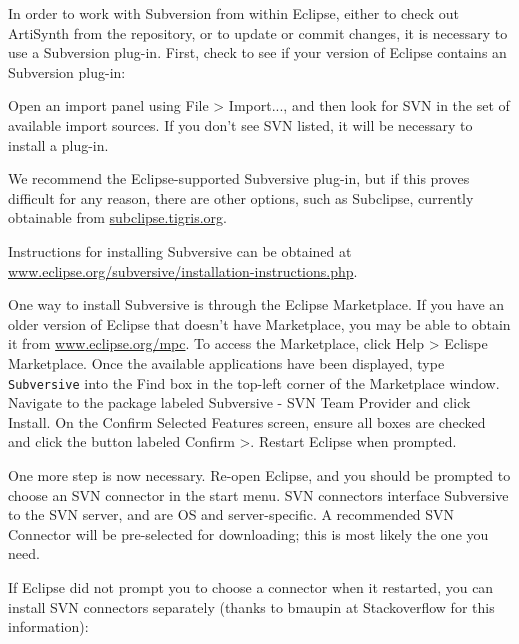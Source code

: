In order to work with Subversion from within Eclipse, either to check
out ArtiSynth from the repository, or to update or commit changes, it
is necessary to use a Subversion plug-in. First, check to see if your
version of Eclipse contains an Subversion plug-in:

Open an import panel using {\sf File > Import...}, and then look for
{\sf SVN} in the set of available import sources. If you don't see SVN
listed, it will be necessary to install a plug-in.

We recommend the Eclipse-supported Subversive plug-in, but if this
proves difficult for any reason, there are other options, such as
Subclipse, currently obtainable from
\href{http://subclipse.tigris.org/servlets/ProjectProcess?pageID=p4wYuA}
{subclipse.tigris.org}.

Instructions for installing Subversive can be obtained at
\href{http://www.eclipse.org/subversive/installation-instructions.php}
{www.eclipse.org/subversive/installation-instructions.php}.

One way to install Subversive is through the Eclipse Marketplace.  If
you have an older version of Eclipse that doesn't have Marketplace,
you may be able to obtain it from
\href{http://www.eclipse.org/mpc/}{www.eclipse.org/mpc}.  To access
the Marketplace, click {\sf Help > Eclispe Marketplace}. Once the
available applications have been displayed, type {\tt Subversive} into
the {\sf Find} box in the top-left corner of the Marketplace
window. Navigate to the package labeled {\sf Subversive - SVN Team
Provider} and click {\sf Install}. On the {\sf Confirm Selected
Features} screen, ensure all boxes are checked and click the button
labeled {\sf Confirm >}. Restart Eclipse when prompted.

One more step is now necessary. Re-open Eclipse, and you should be
prompted to choose an SVN connector in the start menu.  SVN connectors
interface Subversive to the SVN server, and are OS and
server-specific. A recommended SVN Connector will be pre-selected for
downloading; this is most likely the one you need.

If Eclipse did not prompt you to choose a connector when it restarted,
you can install SVN connectors separately (thanks to bmaupin at
Stackoverflow for this information):

